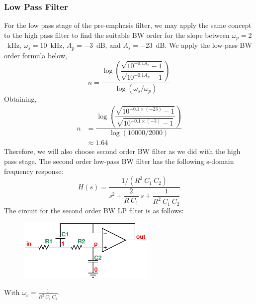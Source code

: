 \documentclass[report]{IEEEtran}
\newcommand{\inv}[1]{\dfrac{1}{#1}}
\begin{document}
			\subsubsection{Low Pass Filter}
				For the low pass stage of the pre-emphasis filter, we may apply the same concept to the high pass filter to find the suitable BW order for the slope between $\omega_p=2$~kHz, $\omega_s=10$~kHz, $A_p=-3$~dB, and $A_s=-23$~dB. We apply the low-pass BW order formula below, 
				\begin{equation}
					\label{spec:lp:eq:n}
						n=\dfrac{
							\log{\left(
								\dfrac{
									\sqrt{10^{-0.1A_s}-1}
								}{
									\sqrt{10^{-0.1A_p}-1}
								}
							\right)}}{
							\log{
								(\omega_s / \omega_p)
							}
						}
				\end{equation}
				Obtaining,
				\begin{align*}
					n&=\dfrac{
						\log{\left(
							\dfrac{
								\sqrt{10^{-0.1\times (-23)}-1}
							}{
								\sqrt{10^{-0.1\times (-3)}-1}
							}
						\right)}}{
						\log{
							(10000 / 2000)
						}
					} \\
					&\approx 1.64
				\end{align*}
				Therefore, we will also choose second order BW filter as we did with the high pass stage. The second order low-pass BW filter has the following s-domain frequency response:
				\begin{equation}
					\label{spec:bw:lp:n2}
					H(s)=\dfrac{1/(R^2~C_1~C_2)}{s^2+\dfrac{2}{R~C_1}~s+\inv{R^2~C_1~C_2}}
				\end{equation}
				The circuit for the second order BW LP filter is as follows:
				\begin{figure}[h!]
					\begin{center}
						\includegraphics[width=250px]{lp.eps}
					\end{center}
				\end{figure}
				
				With $\omega_c = \tfrac{1}{R^2~C_1~C_2}$.
\end{document}
